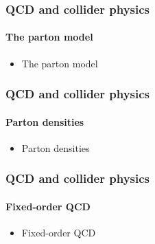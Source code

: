 \documentclass[aspectratio=43]{beamer}
\begin{document}
\begin{frame}
	
	\frametitle{QCD and collider physics}
	\framesubtitle{The parton model}
	
	\begin{itemize}
		\item \footnotesize The parton model
	\end{itemize}

\end{frame}

\begin{frame}
	
	\frametitle{QCD and collider physics}
	\framesubtitle{Parton densities}
	
	\begin{itemize}
		\item \footnotesize Parton densities
	\end{itemize}

\end{frame}

\begin{frame}
	
	\frametitle{QCD and collider physics}
	\framesubtitle{Fixed-order QCD}
	
	\begin{itemize}
		\item \footnotesize Fixed-order QCD
	\end{itemize}

\end{frame}
\end{document}
